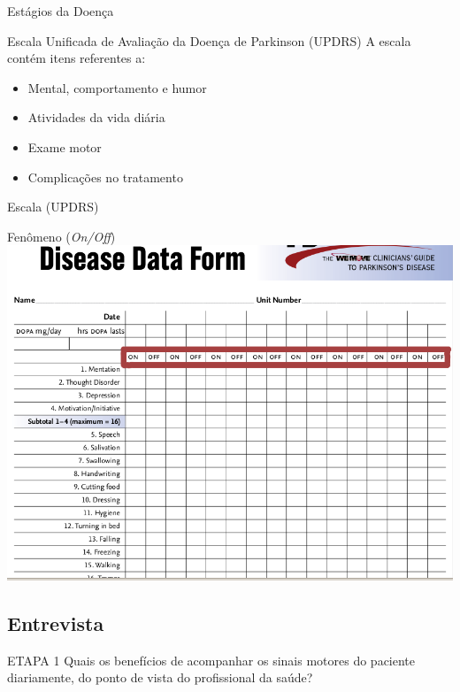 \documentclass{beamer}
\begin{document}
\begin{frame}{Estágios da Doença}
  \begin{block}{Escala Unificada de Avaliação da Doença de Parkinson (UPDRS)}
      A escala contém itens referentes a:
	\begin{itemize}
	 \item Mental, comportamento e humor
	 \item Atividades da vida diária
	 \item Exame motor
	 \item Complicações no tratamento
	\end{itemize}
 \end{block}
\end{frame}

\begin{frame}{Escala (UPDRS)} 
    \begin{block}{Fenômeno (\textit{On/Off})}
      \center \includegraphics[height=2.4 in]{img/updr1-sel.png}
    \end{block}		
\end{frame}



\subsection{Entrevista}
\begin{frame}
  \begin{block}{ETAPA 1}
   Quais os benefícios de acompanhar os sinais motores do paciente diariamente, do ponto de vista do profissional da saúde?
  \end{block}
\end{frame}
\end{document}
